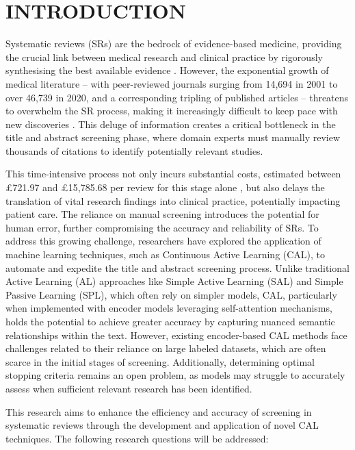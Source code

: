 \documentclass[10pt, english]{article}
\begin{document}
\newpage
\section{INTRODUCTION}

Systematic reviews (SRs) are the bedrock of evidence-based medicine, providing the crucial link between medical research and clinical practice by rigorously synthesising the best available evidence \cite{kranke_evidence-based_2010}. However, the exponential growth of medical literature – with peer-reviewed journals surging from 14,694 in 2001 to over 46,739 in 2020, and a corresponding tripling of published articles – threatens to overwhelm the SR process, making it increasingly difficult to keep pace with new discoveries \cite{ghasemi_scientific_2022}. This deluge of information creates a critical bottleneck in the title and abstract screening phase, where domain experts must manually review thousands of citations to identify potentially relevant studies.

This time-intensive process not only incurs substantial costs, estimated between £721.97 and £15,785.68 per review for this stage alone \cite{antunes_preoperative_nodate, nussbaumer-streit_resource_2021}, but also delays the translation of vital research findings into clinical practice, potentially impacting patient care. The reliance on manual screening introduces the potential for human error, further compromising the accuracy and reliability of SRs. To address this growing challenge, researchers have explored the application of machine learning techniques, such as Continuous Active Learning (CAL), to automate and expedite the title and abstract screening process. Unlike traditional Active Learning (AL) approaches like Simple Active Learning (SAL) and Simple Passive Learning (SPL), which often rely on simpler models, CAL, particularly when implemented with encoder models leveraging self-attention mechanisms, holds the potential to achieve greater accuracy by capturing nuanced semantic relationships within the text. However, existing encoder-based CAL methods face challenges related to their reliance on large labeled datasets, which are often scarce in the initial stages of screening. Additionally, determining optimal stopping criteria remains an open problem, as models may struggle to accurately assess when sufficient relevant research has been identified.


This research aims to enhance the efficiency and accuracy of screening in systematic reviews through the development and application of novel CAL techniques. The following research questions will be addressed:
\end{document}
